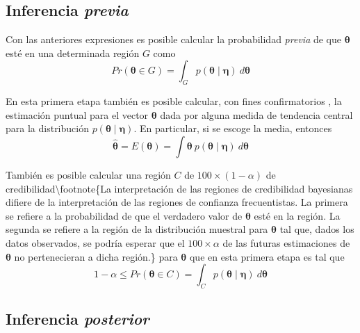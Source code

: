 \documentclass[
  spanish,
  letter]{book}
\theoremstyle{definition}
\theoremstyle{definition}
\theoremstyle{definition}
\theoremstyle{remark}
\begin{document}
\hypertarget{inferencia}{%
\subsection{\texorpdfstring{Inferencia \emph{previa}}{Inferencia }}\label{inferencia}}

Con las anteriores expresiones es posible calcular la probabilidad \emph{previa} de que \(\boldsymbol \theta\) esté en una determinada región \(G\) como
\begin{equation}
Pr(\boldsymbol \theta\in G)=\int_G p(\boldsymbol \theta\mid \boldsymbol \eta)\ d\boldsymbol \theta
\end{equation}

En esta primera etapa también es posible calcular, con fines confirmatorios \cite{Carlin96}, la estimación puntual para el vector \(\boldsymbol \theta\) dada por alguna medida de tendencia central para la distribución \(p(\boldsymbol \theta\mid \boldsymbol \eta)\). En particular, si se escoge la media, entonces
\begin{equation}\label{est.prio}
\hat{\boldsymbol \theta}=E(\boldsymbol \theta)=\int \boldsymbol \theta\ p(\boldsymbol \theta\mid \boldsymbol \eta)\ d\boldsymbol \theta
\end{equation}

También es posible calcular una región \(C\) de \(100\times(1-\alpha)%
\) de credibilidad\textbackslash footnote\{La interpretación de las regiones de credibilidad bayesianas difiere de la interpretación de las regiones de confianza frecuentistas. La primera se refiere a la probabilidad de que el verdadero valor de \(\boldsymbol \theta\) esté en la región. La segunda se refiere a la región de la distribución muestral para \(\boldsymbol \theta\) tal que, dados los datos observados, se podría esperar que el \(100\times\alpha%
\) de las futuras estimaciones de \(\boldsymbol \theta\) no pertenecieran a dicha región.\} para \(\boldsymbol \theta\) que en esta primera etapa es tal que
\begin{equation}
1-\alpha \leq Pr(\boldsymbol \theta\in C)=\int_Cp(\boldsymbol \theta\mid \boldsymbol \eta)\ d\boldsymbol \theta
\end{equation}

\hypertarget{inferencia-1}{%
\subsection{\texorpdfstring{Inferencia \emph{posterior}}{Inferencia }}\label{inferencia-1}}
\end{document}
